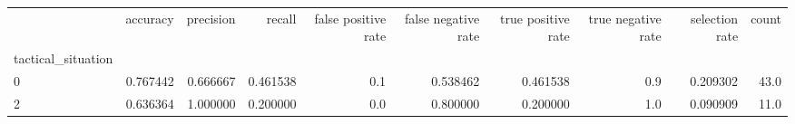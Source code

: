 \begin{tabular}{lrrrrrrrrr}
\toprule
{} &  accuracy &  precision &    recall &  false positive rate &  false negative rate &  true positive rate &  true negative rate &  selection rate &  count \\
tactical\_situation &           &            &           &                      &                      &                     &                     &                 &        \\
\midrule
0                  &  0.767442 &   0.666667 &  0.461538 &                  0.1 &             0.538462 &            0.461538 &                 0.9 &        0.209302 &   43.0 \\
2                  &  0.636364 &   1.000000 &  0.200000 &                  0.0 &             0.800000 &            0.200000 &                 1.0 &        0.090909 &   11.0 \\
\bottomrule
\end{tabular}
